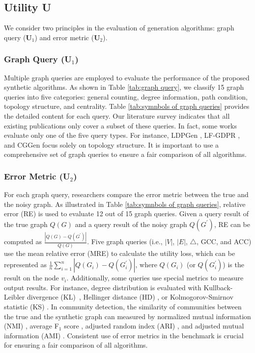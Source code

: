 \documentclass[conference]{IEEEtran}
\theoremstyle{plain}
\begin{document}
\subsection{Utility \textbf{U}}
We consider two principles in the evaluation of generation algorithms: graph query (\textbf{U$_1$}) and error metric (\textbf{U$_2$}).

\subsubsection{Graph Query (\textbf{U$_1$})}
Multiple graph queries are employed to evaluate the performance of the proposed synthetic algorithms. 
As shown in Table \ref{tab:graph query}, we classify 15 graph queries into five categories: general counting, degree information, path condition, topology structure, and centrality. 
Table \ref{tab:symnbols of graph queries} provides the detailed content for each query.
Our literature survey indicates that all existing publications only cover a subset of these queries. 
In fact, some works evaluate only one of the five query types. For instance, LDPGen \cite{qin2017generating}, LF-GDPR \cite{ye2020lf}, and CGGen \cite{ju2019generating} focus solely on topology structure.
It is important to use a comprehensive set of graph queries to ensure a fair comparison of all algorithms.

\subsubsection{Error Metric (\textbf{U$_2$})}
For each graph query, researchers compare the error metric between the true and the noisy graph.
As illustrated in Table \ref{tab:symnbols of graph queries}, relative error (RE) is used to evaluate 12 out of 15 graph queries.
Given a query result of the true graph $Q(G)$ and a query result of the noisy graph $Q(G^\prime)$, RE can be computed as $\frac{|Q(G)-Q(G^\prime)|}{Q(G)}$.
Five graph queries (i.e., $|V|$, $|E|$, $\triangle$, GCC, and ACC) use the mean relative error (MRE) to calculate the utility loss, which can be represented as $\frac{1}{n}\sum_{i=1}^n |Q(G_i)-Q(G_i^\prime)|$, where $Q(G_i)$ (or $Q(G_i^\prime)$) is the result on the node $v_i$.
Additionally, some queries use special metrics to measure output results.
For instance, degree distribution is evaluated with Kullback-Leibler divergence (KL)~\cite{kullback1997information}, Hellinger distance (HD) \cite{nikulin2001hellinger}, or Kolmogorov-Smirnov statistic (KS) \cite{daniel1990kolmogorov}.
In community detection, the similarity of communities between the true and the synthetic graph can measured by normalized mutual information (NMI) \cite{kvalseth1987entropy}, average F$_1$ score \cite{zhang2020community,rossetti2017tiles}, adjusted random index (ARI) \cite{rand1971objective}, and adjusted mutual information (AMI) \cite{vinh2009information}.
Consistent use of error metrics in the benchmark is crucial for ensuring a fair comparison of all algorithms.
\end{document}
